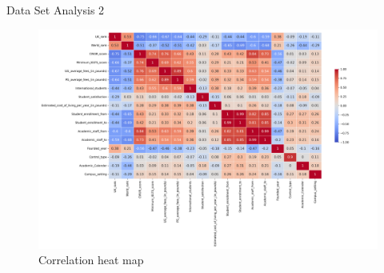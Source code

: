 \documentclass[xcolor=table]{beamer} %
\begin{document}
\begin{frame}{Data Set Analysis 2}
  \vspace{-1.21cm}
  \begin{figure}
    \centering
    \includegraphics[width=0.91 \textwidth]{figs/correlation_heatmap.png}
    \caption{Correlation heat map}
    \label{fig:corr_heatmap}
\end{figure}
\end{frame}
\end{document}
